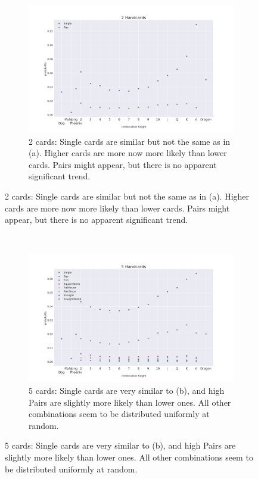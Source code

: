 \begin{figure}[hb]
\begin{center}
        \begin{subfigure}[h]{.8\textwidth}\includegraphics[width=\textwidth]{images/det/type_for_len_2}
            \caption{2 cards: Single cards are similar but not the same as in (a). Higher cards are more now more likely than lower cards. Pairs might appear, but there is no apparent significant trend.}
            \label{fig:hc2}
        \end{subfigure}
    \end{center}
\end{figure}~\begin{figure}[ht]\ContinuedFloat
    \begin{center}
        \begin{subfigure}[h]{.8\textwidth}\includegraphics[width=\textwidth]{images/det/type_for_len_5}
            \caption{5 cards: Single cards are very similar to (b), and high Pairs are slightly more likely than lower ones. All other combinations seem to be distributed uniformly at random.}

\end{subfigure}
\end{center}
\end{figure}
